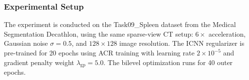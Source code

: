 


\subsubsection{Experimental Setup}

The experiment is conducted on the Task09\_Spleen dataset from the Medical Segmentation Decathlon, using the same sparse-view CT setup: $6\times$ acceleration, Gaussian noise $\sigma = 0.5$, and $128 \times 128$ image resolution. The ICNN regularizer is pre-trained for 20 epochs using ACR training with learning rate $2 \times 10^{-5}$ and gradient penalty weight $\lambda_{\text{gp}} = 5.0$. The bilevel optimization runs for 40 outer epochs.

